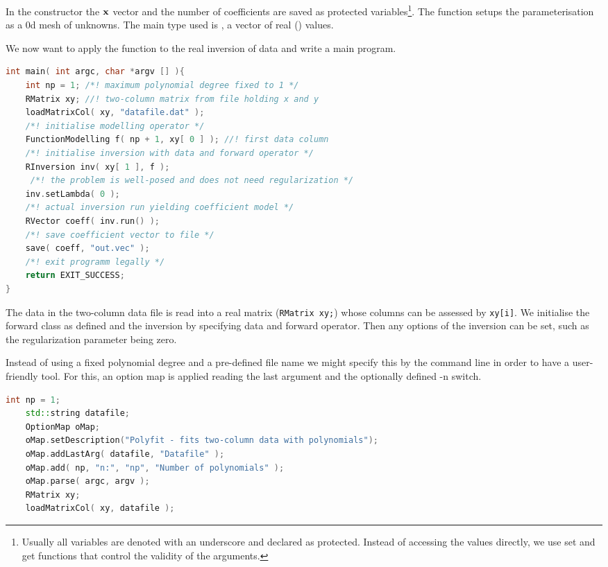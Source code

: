 In the constructor the $\bf x$ vector and the number of coefficients are saved as protected variables\footnote{Usually all variables are denoted with an underscore and declared as protected. Instead of accessing the values directly, we use set and get functions that control the validity of the arguments.}.
The function  setups the parameterisation as a 0d mesh of  unknowns.
The main type used is , a vector of real () values.

We now want to apply the function to the real inversion of data and write a main program.
\begin{lstlisting}[language=C++,morekeywords={RVector,RMatrix,RInversion,EXIT_SUCCESS}]
int main( int argc, char *argv [] ){
    int np = 1; /*! maximum polynomial degree fixed to 1 */
    RMatrix xy; //! two-column matrix from file holding x and y
    loadMatrixCol( xy, "datafile.dat" );
    /*! initialise modelling operator */
    FunctionModelling f( np + 1, xy[ 0 ] ); //! first data column
    /*! initialise inversion with data and forward operator */
    RInversion inv( xy[ 1 ], f );
     /*! the problem is well-posed and does not need regularization */
    inv.setLambda( 0 );
    /*! actual inversion run yielding coefficient model */
    RVector coeff( inv.run() );
    /*! save coefficient vector to file */
    save( coeff, "out.vec" );
    /*! exit programm legally */
    return EXIT_SUCCESS;
}
\end{lstlisting}

The data in the two-column data file is read into a real matrix (\lstinline|RMatrix xy;|) whose columns can be assessed by \lstinline|xy[i]|. We initialise the forward class as defined and the inversion by specifying data and forward operator.
Then any options of the inversion can be set, such as the regularization parameter being zero.

Instead of using a fixed polynomial degree and a pre-defined file name we might specify this by the command line in order to have a user-friendly tool.
For this, an option map is applied reading the last argument and the optionally defined -n switch.
\begin{lstlisting}[language=C++,morekeywords={OptionMap,RMatrix,loadMatrixCol}]
    int np = 1;
    std::string datafile;
    OptionMap oMap;
    oMap.setDescription("Polyfit - fits two-column data with polynomials");
    oMap.addLastArg( datafile, "Datafile" );
    oMap.add( np, "n:", "np", "Number of polynomials" );
    oMap.parse( argc, argv );
    RMatrix xy; 
    loadMatrixCol( xy, datafile );
\end{lstlisting}

